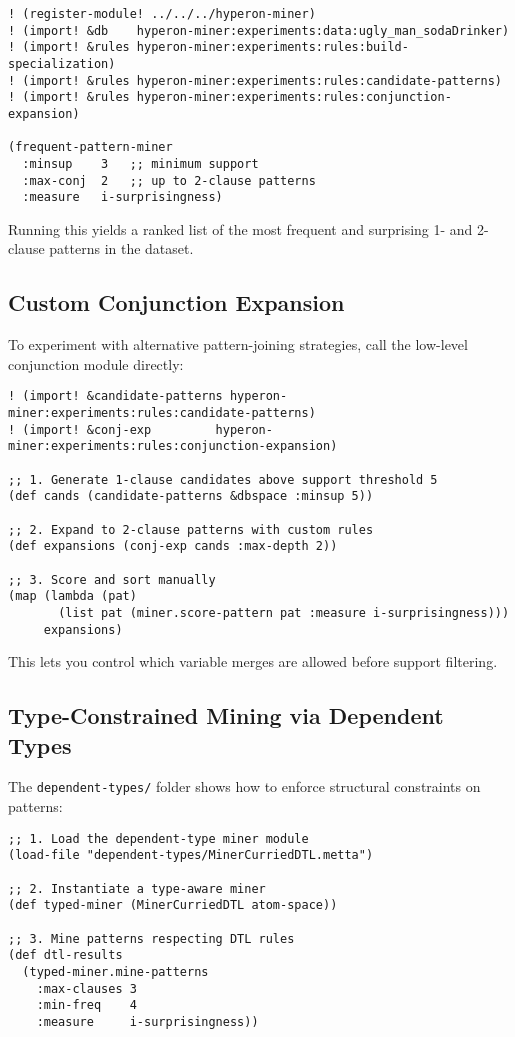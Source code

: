 \begin{verbatim}
! (register-module! ../../../hyperon-miner)
! (import! &db    hyperon-miner:experiments:data:ugly_man_sodaDrinker)
! (import! &rules hyperon-miner:experiments:rules:build-specialization)
! (import! &rules hyperon-miner:experiments:rules:candidate-patterns)
! (import! &rules hyperon-miner:experiments:rules:conjunction-expansion)

(frequent-pattern-miner
  :minsup    3   ;; minimum support
  :max-conj  2   ;; up to 2-clause patterns
  :measure   i-surprisingness)
\end{verbatim}

Running this yields a ranked list of the most frequent and surprising 1- and 2-clause patterns in the dataset.

\subsection{Custom Conjunction Expansion}

To experiment with alternative pattern-joining strategies, call the low-level conjunction module directly:

\begin{verbatim}
! (import! &candidate-patterns hyperon-miner:experiments:rules:candidate-patterns)
! (import! &conj-exp         hyperon-miner:experiments:rules:conjunction-expansion)

;; 1. Generate 1-clause candidates above support threshold 5
(def cands (candidate-patterns &dbspace :minsup 5))

;; 2. Expand to 2-clause patterns with custom rules
(def expansions (conj-exp cands :max-depth 2))

;; 3. Score and sort manually
(map (lambda (pat)
       (list pat (miner.score-pattern pat :measure i-surprisingness)))
     expansions)
\end{verbatim}

This lets you control which variable merges are allowed before support filtering.

\subsection{Type-Constrained Mining via Dependent Types}

The \texttt{dependent-types/} folder shows how to enforce structural constraints on patterns:

\begin{verbatim}
;; 1. Load the dependent-type miner module
(load-file "dependent-types/MinerCurriedDTL.metta")

;; 2. Instantiate a type-aware miner
(def typed-miner (MinerCurriedDTL atom-space))

;; 3. Mine patterns respecting DTL rules
(def dtl-results
  (typed-miner.mine-patterns
    :max-clauses 3
    :min-freq    4
    :measure     i-surprisingness))
\end{verbatim}


